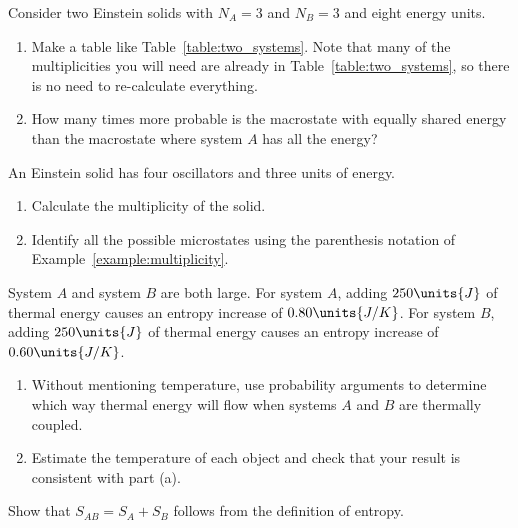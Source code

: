 \begin{problem}
Consider two Einstein solids with $N_A=3$ and $N_B=3$ and eight energy
units. 
\begin{enumerate}
\item Make a table like Table~\ref{table:two_systems}.  Note that many
  of the multiplicities you will need are already in
  Table~\ref{table:two_systems}, so there is no need to re-calculate
  everything. 
\item How many times more probable is the macrostate with equally
  shared energy than the macrostate where system $A$ has all the energy?
\end{enumerate}
\end{problem}

\begin{problem}
An Einstein solid has four oscillators and three units of energy.
\begin{enumerate}
\item Calculate the multiplicity of the solid.
\item Identify all the possible microstates using the parenthesis
  notation of Example~\ref{example:multiplicity}.
\end{enumerate}
\end{problem}

\begin{problem}
System $A$ and system $B$ are both large.    For system $A$, adding
$250\units{J}$ of thermal energy causes an entropy increase of
$0.80\units{J/K}$.  For system $B$, adding $250\units{J}$ of thermal
energy causes an entropy increase of $0.60\units{J/K}$.
\begin{enumerate}
\item Without mentioning temperature, use probability arguments to
  determine which way thermal energy will flow when systems $A$ and
  $B$ are thermally coupled.
\item Estimate the temperature of each object and check that your
  result is consistent with part (a).
\end{enumerate}
\end{problem}

\begin{problem}
Show that $S_{AB} = S_A + S_B$ follows from the definition of entropy.
\label{problem:entropy_additive}
\end{problem}

